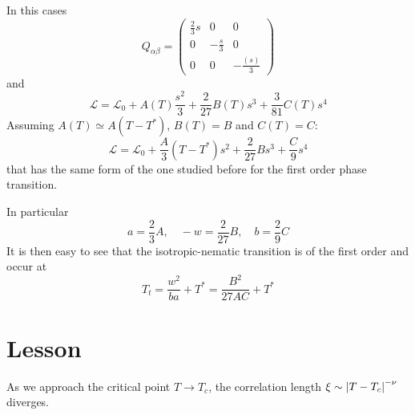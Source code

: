 \documentclass[../main/main.tex]{subfiles}
\begin{document}
In this cases
\begin{equation}
  Q_{\alpha \beta } =
  \begin{pmatrix}
  \frac{2}{3}s   & 0  & 0 \\
    0 &  - \frac{s  }{3} & 0 \\
    0 &  0 & - \frac{(s )}{3}
  \end{pmatrix}
\end{equation}
and
\begin{equation}
  \mathcal{L} = \mathcal{L}_0 + A(T) \frac{s^2}{3} + \frac{2}{27} B(T) s^3 + \frac{3}{81} C(T) s^4
\end{equation}
Assuming \( A(T) \simeq A (T-T^*) \), \( B(T) =B \) and \( C(T) = C \):
\begin{equation}
  \mathcal{L} = \mathcal{L}_0 + \frac{A}{3} (T-T^*) s^2 + \frac{2}{27} B s^3 + \frac{C}{9} s^4
\end{equation}
that has the same form of the one studied before for the first order phase transition.

In particular
\begin{equation}
  a = \frac{2}{3} A, \quad -w = \frac{2}{27} B, \quad b = \frac{2}{9} C
\end{equation}
It is then easy to see that the isotropic-nematic transition is of the first order and occur at
\begin{equation}
  T_t = \frac{w^2}{ba} + T^* = \frac{B^2}{27 A C} + T^*
\end{equation}











\section{Lesson}



As we approach the critical point \( T \rightarrow T_c \), the correlation length
\( \xi \sim \abs{T-T_c}^{-\nu }  \) diverges.
\end{document}
